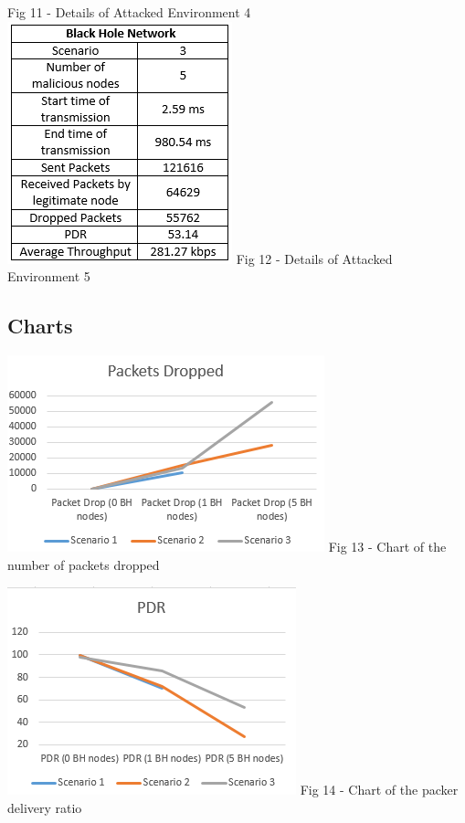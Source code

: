 \documentclass[conference,12pt]{IEEEtran}
\begin{document}
\begin{center}
\linebreak 
Fig 11 - Details of Attacked Environment 4
\includegraphics{BH5Scen3}
\linebreak 
Fig 12 - Details of Attacked Environment 5
\end{center}

\subsection{Charts}

\includegraphics{PDChart}
\linebreak 
Fig 13 - Chart of the number of packets dropped

\includegraphics{PDRChart}
\linebreak 
Fig 14 - Chart of the packer delivery ratio
\end{document}
